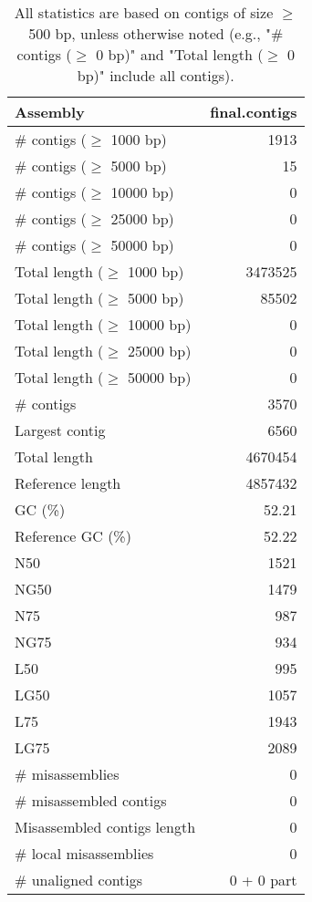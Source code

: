 \documentclass[12pt,a4paper]{article}
\begin{document}
\begin{table}[ht]
\begin{center}
\caption{All statistics are based on contigs of size $\geq$ 500 bp, unless otherwise noted (e.g., "\# contigs ($\geq$ 0 bp)" and "Total length ($\geq$ 0 bp)" include all contigs).}
\begin{tabular}{|l*{1}{|r}|}
\hline
Assembly & final.contigs \\ \hline
\# contigs ($\geq$ 1000 bp) & 1913 \\ \hline
\# contigs ($\geq$ 5000 bp) & 15 \\ \hline
\# contigs ($\geq$ 10000 bp) & 0 \\ \hline
\# contigs ($\geq$ 25000 bp) & 0 \\ \hline
\# contigs ($\geq$ 50000 bp) & 0 \\ \hline
Total length ($\geq$ 1000 bp) & 3473525 \\ \hline
Total length ($\geq$ 5000 bp) & 85502 \\ \hline
Total length ($\geq$ 10000 bp) & 0 \\ \hline
Total length ($\geq$ 25000 bp) & 0 \\ \hline
Total length ($\geq$ 50000 bp) & 0 \\ \hline
\# contigs & 3570 \\ \hline
Largest contig & 6560 \\ \hline
Total length & 4670454 \\ \hline
Reference length & 4857432 \\ \hline
GC (\%) & 52.21 \\ \hline
Reference GC (\%) & 52.22 \\ \hline
N50 & 1521 \\ \hline
NG50 & 1479 \\ \hline
N75 & 987 \\ \hline
NG75 & 934 \\ \hline
L50 & 995 \\ \hline
LG50 & 1057 \\ \hline
L75 & 1943 \\ \hline
LG75 & 2089 \\ \hline
\# misassemblies & 0 \\ \hline
\# misassembled contigs & 0 \\ \hline
Misassembled contigs length & 0 \\ \hline
\# local misassemblies & 0 \\ \hline
\# unaligned contigs & 0 + 0 part \\ \hline

\end{tabular}
\end{center}
\end{table}
\end{document}
